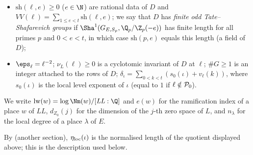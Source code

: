 \begin{definition}
\begin{itemize}
\item $\mathrm{sh}(\ell,e)\ge0$ ($e\in\N$) are rational data of $D$ and $VV(\ell)=\sum_{1\le e<t}\mathrm{sh}(\ell,e)$; we say that $D$
has \emph{finite odd Tate--Shafarevich groups} if $\Sha^1(G_{E,S_p},\Q_p/\Z_p(-e))$ has finite length for all primes $p$ and
$0<e<t$, in which case $\mathrm{sh}(p,e)$ equals this length (a field of $D$);
\item $\eps_\ell=\ell^{-2}$; $\nu_L(\ell)\ge0$ is a cyclotomic invariant of $D$ at $\ell$; $\#G\ge1$ is an integer attached to the
rows of $D$; $\delta_\iota=\sum_{0<k<t}(s_0(\iota)+v_\ell(k))$, where $s_0(\iota)$ is the local level exponent of $\iota$ (equal to $1$ if
$\ell\notin\mathcal P_0$).
\end{itemize}
We write $\mathrm{lw}(w)=\log\Nm(w)/[\mathit{LL}:\Q]$ and $e(w)$ for the ramification index of a place $w$ of $\mathit{LL}$, $d_{Z_0}(j)$
for the dimension of the $j$-th zero space of $L$, and $n_\lambda$ for the local degree of a place $\lambda$ of $E$.
\end{definition}

By  (another section), $\eta_{\mathrm{loc}}(\iota)$ is the
normalised length of the quotient displayed above; this is the description used below.

